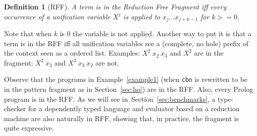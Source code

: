 \documentclass{llncs}
\newtheorem{mydef}{Definition}
\begin{document}
\begin{mydef}[RFF]
A term is in the Reduction Free Fragment iff
every occurrence of a unification variable $X^j$ is applied to
$x_j \ldots x_{j+k-1}$ for $k >= 0$.
\end{mydef}

Note that when $k$ is $0$ the variable is not applied.  Another way to
put it is that a term is in the RFF iff all unification variables see
a (complete, no hole) prefix of the \lp{} context seen as a ordered list.
Examples: $X^2~x_2~x_3$ and $X^2$ are in the fragment; $X^2~x_3$ and
$X^2~x_3~x_2$ are not.

Observe that the programs in Example~\ref{example1} (when \verb+cbn+ is
rewritten to be in the pattern fragment as in Section~\ref{sec:ho}) are in
the RFF.  Also, every Prolog program is in the RFF. As we will see
in~Section~\ref{sec:benchmarks}, a
type-checker for a dependently typed language
and evaluator based on a reduction machine are also naturally in RFF,
showing that, in practice, the fragment is quite expressive.
\end{document}
